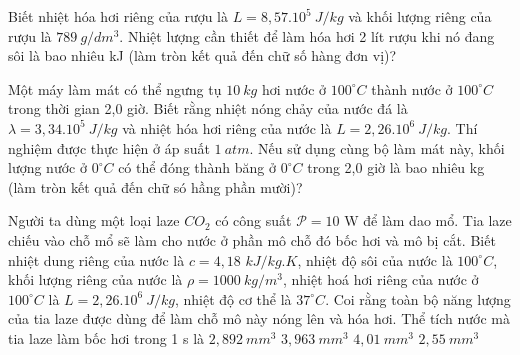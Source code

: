 \begin{ex} 
	Biết nhiệt hóa hơi riêng của rượu là $L=8,57.10^{5} \ J/kg$ và khối lượng riêng của rượu là  $789 \ g / dm^3$. Nhiệt lượng cần thiết để làm hóa hơi 2 lít rượu khi nó đang sôi là bao nhiêu kJ (làm tròn kết quả đến chữ số hàng đơn vị)?
\end{ex}
\begin{ex} 
Một máy làm mát có thể ngưng tụ $10 \ kg$ hơi nước ở $100^\circ C$ thành nước ở $100^\circ C$ trong thời gian 2,0 giờ. Biết rằng nhiệt nóng chảy của nước đá là $\lambda=3,34.10^{5} \ J/kg$ và nhiệt hóa hơi riêng của nước là $L=2,26.10^{6} \ J/kg$. Thí nghiệm được thực hiện ở  áp suất $1\ atm$. Nếu sử dụng cùng bộ làm mát này, khối lượng nước ở $0^\circ C$ có thể đóng thành băng ở $0^\circ C$ trong 2,0 giờ là bao nhiêu kg (làm tròn kết quả đến chữ só hầng phần mười)?
\end{ex}

\begin{ex}%
	Người ta dùng một loại laze $CO_2$ có công suất $\mathcal{P} = 10$ W để làm dao mổ.  Tia laze chiếu vào chỗ mổ sẽ làm cho nước ở phần mô chỗ đó bốc hơi và mô bị cắt. Biết nhiệt dung riêng của nước là $c = 4,18$ $kJ/kg.K$, nhiệt độ sôi của nước là $100^\circ C$, khối lượng riêng của nước là $\rho =1000\ kg/m^3$, nhiệt hoá hơi riêng của nước ở $100^\circ C$ là $L = 2,26.10^6\ J/kg$, nhiệt độ cơ thể là $37^\circ C$. Coi rằng toàn bộ năng lượng của tia laze được dùng để làm chỗ mô này nóng lên và hóa hơi. Thể tích nước mà tia laze làm bốc hơi trong 1 s là
	\choice
	{$2,892\ mm^3$}
	{\True $3,963\ mm^3$}
	{$4,01\ mm^3$}
	{$2,55\ mm^3$}
	\end{ex}
	


